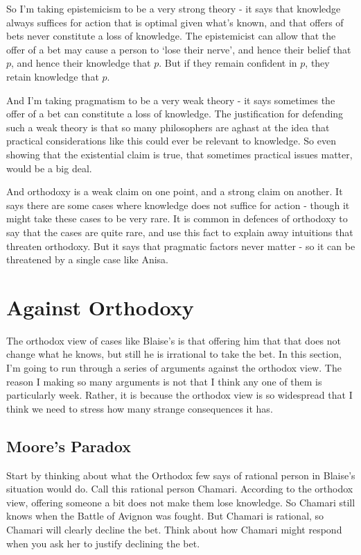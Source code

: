 \documentclass[11pt,]{book}
\begin{document}
So I'm taking epistemicism to be a very strong theory - it says that knowledge always suffices for action that is optimal given what's known, and that offers of bets never constitute a loss of knowledge. The epistemicist can allow that the offer of a bet may cause a person to `lose their nerve', and hence their belief that \(p\), and hence their knowledge that \(p\). But if they remain confident in \(p\), they retain knowledge that \(p\).

And I'm taking pragmatism to be a very weak theory - it says sometimes the offer of a bet can constitute a loss of knowledge. The justification for defending such a weak theory is that so many philosophers are aghast at the idea that practical considerations like this could ever be relevant to knowledge. So even showing that the existential claim is true, that sometimes practical issues matter, would be a big deal.

And orthodoxy is a weak claim on one point, and a strong claim on another. It says there are some cases where knowledge does not suffice for action - though it might take these cases to be very rare. It is common in defences of orthodoxy to say that the cases are quite rare, and use this fact to explain away intuitions that threaten orthodoxy. But it says that pragmatic factors never matter - so it can be threatened by a single case like Anisa.

\hypertarget{orthodox}{%
\section{Against Orthodoxy}\label{orthodox}}

The orthodox view of cases like Blaise's is that offering him that that does not change what he knows, but still he is irrational to take the bet. In this section, I'm going to run through a series of arguments against the orthodox view. The reason I making so many arguments is not that I think any one of them is particularly week. Rather, it is because the orthodox view is so widespread that I think we need to stress how many strange consequences it has.

\hypertarget{moore}{%
\subsection{Moore's Paradox}\label{moore}}

Start by thinking about what the Orthodox few says of rational person in Blaise's situation would do. Call this rational person Chamari. According to the orthodox view, offering someone a bit does not make them lose knowledge. So Chamari still knows when the Battle of Avignon was fought. But Chamari is rational, so Chamari will clearly decline the bet. Think about how Chamari might respond when you ask her to justify declining the bet.
\end{document}
